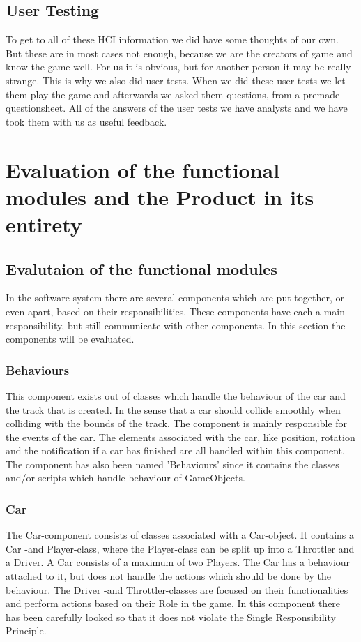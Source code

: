 \documentclass[11pt,twoside,a4paper]{article}
\begin{document}
\subsection{User Testing}
To get to all of these HCI information we did have some thoughts of our own. But these are in most cases not enough, because we are the creators of game and know the game well. For us it is obvious, but for another person it may be really strange. This is why we also did user tests. When we did these user tests we let them play the game and afterwards we asked them questions, from a premade questionsheet. All of the answers of the user tests we have analysts and we have took them with us as useful feedback.

\newpage

\section{Evaluation of the functional modules and the Product in its entirety}

\subsection{Evalutaion of the functional modules}
In the software system there are several components which are put together, or even apart, based on their responsibilities. These components have each a main responsibility, but still communicate with other components. In this section the components will be evaluated.

\subsubsection{Behaviours}
This component exists out of classes which handle the behaviour of the car and the track that is created. In the sense that a car should collide smoothly when colliding with the bounds of the track. The component is mainly responsible for the events of the car. The elements associated with the car, like position, rotation and the notification if a car has finished are all handled within this component. The component has also been named 'Behaviours' since it contains the classes and/or scripts which handle behaviour of GameObjects.

\subsubsection{Car}
The Car-component consists of classes associated with a Car-object. It contains a Car -and Player-class, where the Player-class can be split up into a Throttler and a Driver. A Car consists of a maximum of two Players. The Car has a behaviour attached to it, but does not handle the actions which should be done by the behaviour. The Driver -and Throttler-classes are focused on their functionalities and perform actions based on their Role in the game. In this component there has been carefully looked so that it does not violate the Single Responsibility Principle. 
\end{document}
